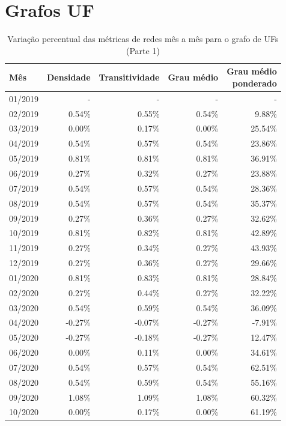 
\section{Grafos UF}

\begin{table}[htb]
\centering
\caption{Variação percentual das métricas de redes mês a mês para o grafo de UFs (Parte 1)}
\label{tab:metricas-redes-pandemia:grafo-mensal-por-uf1}
\begin{tabular}{l|rrrr}
\toprule
Mês & Densidade & Transitividade & Grau médio & \shortstack{Grau médio\\ponderado} \\
\midrule
01/2019 & - & - & - & - \\
02/2019 &  0.54\% &  0.55\% &  0.54\% &  9.88\% \\
03/2019 &  0.00\% &  0.17\% &  0.00\% & 25.54\% \\
04/2019 &  0.54\% &  0.57\% &  0.54\% & 23.86\% \\
05/2019 &  0.81\% &  0.81\% &  0.81\% & 36.91\% \\
06/2019 &  0.27\% &  0.32\% &  0.27\% & 23.88\% \\
07/2019 &  0.54\% &  0.57\% &  0.54\% & 28.36\% \\
08/2019 &  0.54\% &  0.57\% &  0.54\% & 35.37\% \\
09/2019 &  0.27\% &  0.36\% &  0.27\% & 32.62\% \\
10/2019 &  0.81\% &  0.82\% &  0.81\% & 42.89\% \\
11/2019 &  0.27\% &  0.34\% &  0.27\% & 43.93\% \\
12/2019 &  0.27\% &  0.36\% &  0.27\% & 29.66\% \\
01/2020 &  0.81\% &  0.83\% &  0.81\% & 28.84\% \\
02/2020 &  0.27\% &  0.44\% &  0.27\% & 32.22\% \\
03/2020 &  0.54\% &  0.59\% &  0.54\% & 36.09\% \\
04/2020 & -0.27\% & -0.07\% & -0.27\% & -7.91\% \\
05/2020 & -0.27\% & -0.18\% & -0.27\% & 12.47\% \\
06/2020 &  0.00\% &  0.11\% &  0.00\% & 34.61\% \\
07/2020 &  0.54\% &  0.57\% &  0.54\% & 62.51\% \\
08/2020 &  0.54\% &  0.59\% &  0.54\% & 55.16\% \\
09/2020 &  1.08\% &  1.09\% &  1.08\% & 60.32\% \\
10/2020 &  0.00\% &  0.17\% &  0.00\% & 61.19\% \\
\bottomrule
\end{tabular}
\fdadospesquisa
\end{table}

